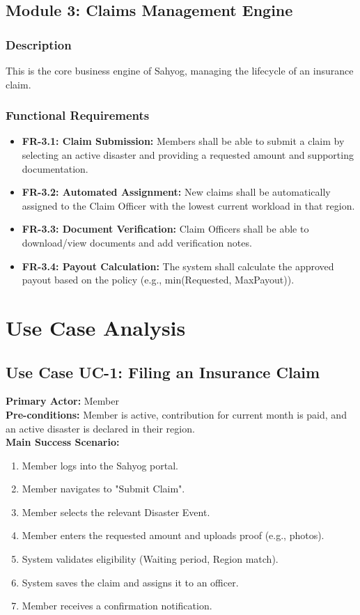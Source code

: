 \documentclass[12pt,a4paper]{article}
\begin{document}
\subsection{Module 3: Claims Management Engine}

\subsubsection{Description}
This is the core business engine of Sahyog, managing the lifecycle of an insurance claim.

\subsubsection{Functional Requirements}
\begin{itemize}
    \item \textbf{FR-3.1: Claim Submission:} Members shall be able to submit a claim by selecting an active disaster and providing a requested amount and supporting documentation.
    \item \textbf{FR-3.2: Automated Assignment:} New claims shall be automatically assigned to the Claim Officer with the lowest current workload in that region.
    \item \textbf{FR-3.3: Document Verification:} Claim Officers shall be able to download/view documents and add verification notes.
    \item \textbf{FR-3.4: Payout Calculation:} The system shall calculate the approved payout based on the policy (e.g., min(Requested, MaxPayout)).
\end{itemize}

\section{Use Case Analysis}

\subsection{Use Case UC-1: Filing an Insurance Claim}
\textbf{Primary Actor:} Member \\
\textbf{Pre-conditions:} Member is active, contribution for current month is paid, and an active disaster is declared in their region. \\
\textbf{Main Success Scenario:}
\begin{enumerate}
    \item Member logs into the Sahyog portal.
    \item Member navigates to "Submit Claim".
    \item Member selects the relevant Disaster Event.
    \item Member enters the requested amount and uploads proof (e.g., photos).
    \item System validates eligibility (Waiting period, Region match).
    \item System saves the claim and assigns it to an officer.
    \item Member receives a confirmation notification.
\end{enumerate}
\end{document}
